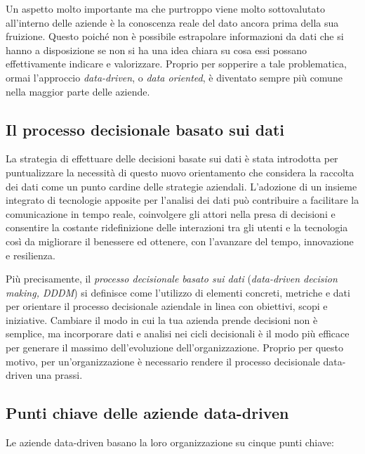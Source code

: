 Un aspetto molto importante ma che purtroppo viene molto sottovalutato all'interno delle aziende è la conoscenza reale del dato ancora prima della sua fruizione. Questo poiché non è possibile estrapolare informazioni da dati che si hanno a disposizione se non si ha una idea chiara su cosa essi possano effettivamente indicare e valorizzare. Proprio per sopperire a tale problematica, ormai l'approccio \textit{data-driven}, o \textit{data oriented}, è diventato sempre più comune nella maggior parte delle aziende.

\subsection{Il processo decisionale basato sui dati}

La strategia di effettuare delle decisioni basate sui dati è stata introdotta per puntualizzare la necessità di questo nuovo orientamento che considera la raccolta dei dati come un punto cardine delle strategie aziendali. L'adozione di un insieme integrato di tecnologie apposite per l'analisi dei dati può contribuire a facilitare la comunicazione in tempo reale, coinvolgere gli attori nella presa di decisioni e consentire la costante ridefinizione delle interazioni tra gli utenti e la tecnologia così da migliorare il benessere ed ottenere, con l'avanzare del tempo, innovazione e resilienza.~\cite{emerald_data_driven_orientation}

Più precisamente, il \textit{processo decisionale basato sui dati} (\textit{data-driven decision making, DDDM}) si definisce come l'utilizzo di elementi concreti, metriche e dati per orientare il processo decisionale aziendale in linea con obiettivi, scopi e iniziative. Cambiare il modo in cui la tua azienda prende decisioni non è semplice, ma incorporare dati e analisi nei cicli decisionali è il modo più efficace per generare il massimo dell'evoluzione dell'organizzazione. Proprio per questo motivo, per un'organizzazione è necessario rendere il processo decisionale data-driven una prassi.~\cite{tableau_data_driven_decision_making}

\subsection{Punti chiave delle aziende data-driven}
Le aziende data-driven basano la loro organizzazione su cinque punti chiave:~\cite{researchgate_data_driven_orientation}

